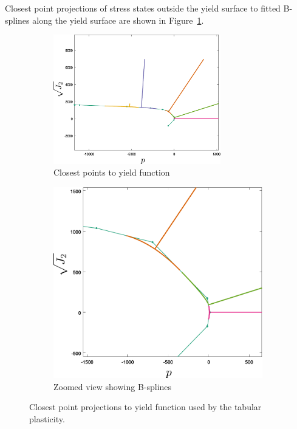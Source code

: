 Closest point projections of stress states outside the yield surface to fitted B-splines 
along the yield surface are shown in Figure~\ref{fig:tabular_yield_closest}.
\begin{figure}[htbp!]
  \begin{subfigure}[t]{0.5\textwidth}
    \includegraphics[width=0.8\textwidth]{Figs/tabular/table_yield_closest.pdf}
    \caption{Closest points to yield function}
  \end{subfigure}
  \begin{subfigure}[t]{0.5\textwidth}
    \includegraphics[width=\textwidth]{Figs/tabular/table_yield_closest_zoom.pdf}
    \caption{Zoomed view showing B-splines}
  \end{subfigure}
  \caption{Closest point projections to yield function used by the tabular plasticity.}
  \label{fig:tabular_yield_closest}
\end{figure}

